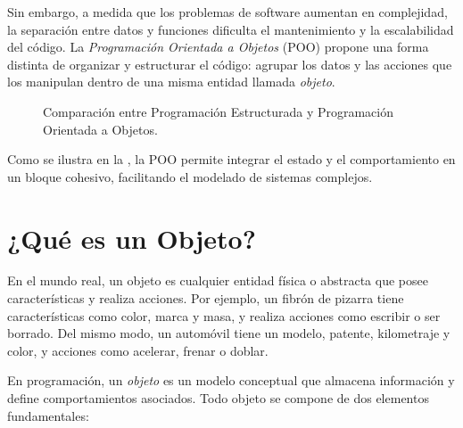 Sin embargo, a medida que los problemas de software aumentan en complejidad, la separación entre
datos y funciones dificulta el mantenimiento y la escalabilidad del código.
La \textit{Programación Orientada a Objetos} (POO) propone una forma distinta de organizar y estructurar
el código: agrupar los datos y las acciones que los manipulan dentro de una misma entidad llamada \textit{objeto}.

\begin{figure}[!ht]
  \centering
  \caption{Comparación entre Programación Estructurada y Programación Orientada a Objetos.}
  \label{fig:estructurada_vs_poo}
\end{figure}

Como se ilustra en la , la POO permite integrar el estado y el comportamiento
en un bloque cohesivo, facilitando el modelado de sistemas complejos.

\section{¿Qué es un Objeto?}
En el mundo real, un objeto es cualquier entidad física o abstracta que posee características y realiza acciones.
Por ejemplo, un fibrón de pizarra tiene características como color, marca y masa, y realiza acciones como
escribir o ser borrado. Del mismo modo, un automóvil tiene un modelo, patente, kilometraje y color, y acciones
como acelerar, frenar o doblar.

En programación, un \textit{objeto} es un modelo conceptual que almacena información y define comportamientos
asociados. Todo objeto se compone de dos elementos fundamentales:


